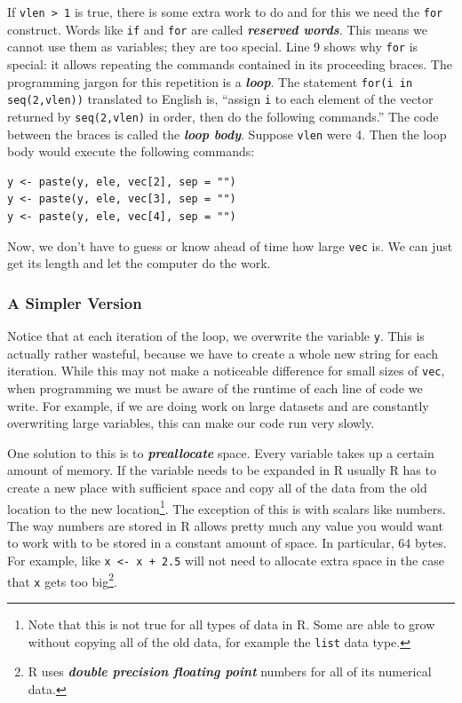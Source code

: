 \documentclass[12pt]{article}
\theoremstyle{remark}
\newcommand{\vocab}[1]{\textbf{\emph{#1}}}
\begin{document}
If \verb|vlen > 1| is true, there is some extra work to do and for this we need the \verb|for| construct. Words like \verb|if| and \verb|for| are called \vocab{reserved words}. This means we cannot use them as variables; they are too special. Line 9 shows why \verb|for| is special: it allows repeating the commands contained in its proceeding braces. The programming jargon for this repetition is a \vocab{loop}. The statement \verb|for(i in seq(2,vlen))| translated to English is, ``assign \verb|i| to each element of the vector returned by \verb|seq(2,vlen)| in order, then do the following commands.'' The code between the braces is called the \vocab{loop body}. Suppose \verb|vlen| were 4. Then the loop body would execute the following commands:

\begin{verbatim}
y <- paste(y, ele, vec[2], sep = "")
y <- paste(y, ele, vec[3], sep = "")
y <- paste(y, ele, vec[4], sep = "")
\end{verbatim}

Now, we don't have to guess or know ahead of time how large \verb|vec| is. We can just get its length and let the computer do the work.

\subsubsection{A Simpler Version}
Notice that at each iteration of the loop, we overwrite the variable \verb|y|. This is actually rather wasteful, because we have to create a whole new string for each iteration. While this may not make a noticeable difference for small sizes of \verb|vec|, when programming we must be aware of the runtime of each line of code we write. For example, if we are doing work on large datasets and are constantly overwriting large variables, this can make our code run very slowly.

One solution to this is to \vocab{preallocate} space. Every variable takes up a certain amount of memory. If the variable needs to be expanded in R usually R has to create a new place with sufficient space and copy all of the data from the old location to the new location\footnote{Note that this is not true for all types of data in R. Some are able to grow without copying all of the old data, for example the \verb|list| data type.}. The exception of this is with scalars like numbers. The way numbers are stored in R allows pretty much any value you would want to work with to be stored in a constant amount of space. In particular, 64 bytes. For example, like \verb|x <- x + 2.5| will not need to allocate extra space in the case that \verb|x| gets too big\footnote{R uses \vocab{double precision floating point} numbers for all of its numerical data.}.
\end{document}
